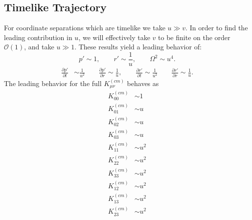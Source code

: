 \documentclass[10pt,letterpaper]{article}
\begin{document}
\subsection*{Timelike Trajectory}
For coordinate separations which are timelike we take $u\gg v$. In order to find the leading contribution in $u$, we will effectively take $v$ to be finite on the order $\mathcal O(1)$,  and take $u\gg1$. These results yield a leading behavior of:
\begin{equation}
p'\sim 1,\qquad r'\sim \frac{1}{u},\qquad \Omega^2\sim u^4. 
\end{equation}
\begin{align}
\frac{\partial p'}{\partial t} & \sim  \frac{1}{u^2}\qquad
\frac{\partial p'}{\partial r}  \sim 	\frac{1}{u},\qquad
\frac{\partial r'}{\partial t}  \sim \frac{1}{u^2}\qquad
\frac{\partial r'}{\partial r}  \sim  \frac{1}{u}.
\end{align}
The leading behavior for the full $K_{\mu\nu}^{(cm)}$ behaves as
\begin{align}
K^{(cm)}_{00} &\sim 1 \nonumber\\
K^{(cm)}_{01} &\sim  u\nonumber\\
K^{(cm)}_{02} &\sim  u\nonumber\\
K^{(cm)}_{03} &\sim   u\nonumber\\
K^{(cm)}_{11} &\sim  u^2\nonumber\\
K^{(cm)}_{22} &\sim  u^2\nonumber\\
K^{(cm)}_{33} &\sim  u^2\nonumber\\
K^{(cm)}_{12} &\sim u^2\nonumber\\
K^{(cm)}_{13} &\sim u^2\nonumber\\
K^{(cm)}_{23} &\sim u^2
\end{align}
\end{document}
